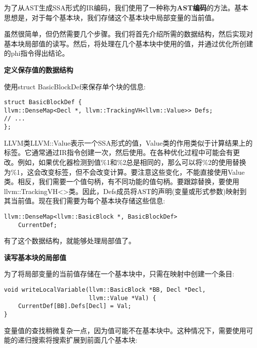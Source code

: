 为了从AST生成SSA形式的IR编码，我们使用了一种称为\textbf{AST编码}的方法。基本思想是，对于每个基本块，我们存储这个基本块中局部变量的当前值。\par

虽然很简单，但仍然需要几个步骤。我们将首先介绍所需的数据结构，然后实现对基本块局部值的读写。然后，将处理在几个基本块中使用的值，并通过优化所创建的phi指令得出结论。\par

\hspace*{\fill} \par %
\textbf{定义保存值的数据结构}

使用struct BasicBlockDef来保存单个块的信息:\par

\begin{lstlisting}[caption={}]
struct BasicBlockDef {
llvm::DenseMap<Decl *, llvm::TrackingVH<llvm::Value>> Defs;
// ...
};
\end{lstlisting}

LLVM类LLVM::Value表示一个SSA形式的值，Value类的作用类似于计算结果上的标签。它通常通过IR指令创建一次，然后使用。在各种优化过程中可能会有更改。例如，如果优化器检测到值\%1和\%2总是相同的，那么可以将\%2的使用替换为\%1，这会改变标签，但不会改变计算。要注意这些变化，不能直接使用Value类。相反，我们需要一个值句柄，有不同功能的值句柄。要跟踪替换，要使用llvm::TrackingVH<>类。因此，Defs成员将AST的声明(变量或形式参数)映射到其当前值。现在我们需要为每个基本块存储这些信息:\par

\begin{lstlisting}[caption={}]
llvm::DenseMap<llvm::BasicBlock *, BasicBlockDef>
	CurrentDef;
\end{lstlisting}

有了这个数据结构，就能够处理局部值了。\par

\hspace*{\fill} \par %
\textbf{读写基本块的局部值}

为了将局部变量的当前值存储在一个基本块中，只需在映射中创建一个条目:\par

\begin{lstlisting}[caption={}]
void writeLocalVariable(llvm::BasicBlock *BB, Decl *Decl,
						llvm::Value *Val) {
	CurrentDef[BB].Defs[Decl] = Val;
}
\end{lstlisting}

变量值的查找稍微复杂一点，因为值可能不在基本块中。这种情况下，需要使用可能的递归搜索将搜索扩展到前面几个基本块:\par

